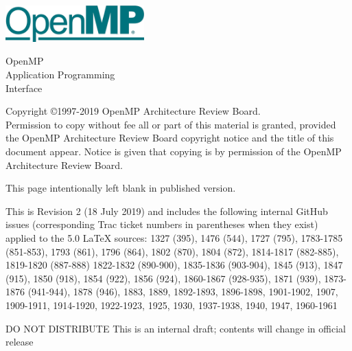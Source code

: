 
  \begin{titlepage}
    \begin{flushleft}
     \hspace{-6em} \includegraphics[width=0.4\textwidth]{openmp-logo.png}
    \end{flushleft}

    \begin{adjustwidth}{-0.75in}{0in}
    \begin{center}
      \Huge
      \textsf{OpenMP\\Application Programming\\Interface}

      \vspace{0.5in}\textsf{    }\vspace{-0.7in}
      \normalsize

      \vspace{1.0in}

      \textbf{\ompversion{}}
    \end{center}
    \end{adjustwidth}

    \vspace{3.0in}

\begin{adjustwidth}{0pt}{1em}\setlength{\parskip}{0.25\baselineskip}%
Copyright \copyright 1997-2019 OpenMP Architecture Review Board.\\
Permission to copy without fee all or part of this material is granted,
provided the OpenMP Architecture Review Board copyright notice and
the title of this document appear. Notice is given that copying is by
permission of the OpenMP Architecture Review Board.\end{adjustwidth}

  \end{titlepage}


\clearpage
\thispagestyle{empty}
\phantom{a}
This page intentionally left blank in published version.

This is Revision 2 (18 July 2019) and includes the following internal 
GitHub issues (corresponding Trac ticket numbers in parentheses when
they exist) applied to the 5.0 LaTeX sources: 1327 (395), 1476 (544), 
1727 (795), 1783-1785 (851-853), 1793 (861), 1796 (864), 1802 (870), 
1804 (872), 1814-1817 (882-885), 1819-1820 (887-888) 1822-1832 (890-900), 
1835-1836 (903-904), 1845 (913), 1847 (915), 1850 (918), 
1854 (922), 1856 (924), 1860-1867 (928-935), 1871 (939), 
1873-1876 (941-944), 1878 (946), 1883, 1889, 1892-1893, 1896-1898, 
1901-1902, 1907, 1909-1911, 1914-1920, 1922-1923, 1925, 1930, 
1937-1938, 1940, 1947, 1960-1961

DO NOT DISTRIBUTE
This is an internal draft; contents will change in official release

\vfill

